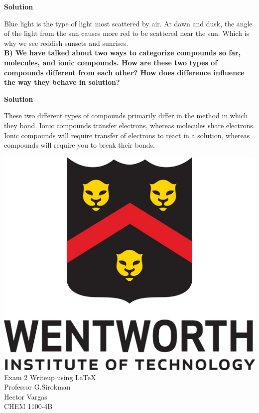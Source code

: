 \documentclass{article}
\begin{document}
    \textbf{Solution}

    Blue light is the type of light most scattered by air. At dawn and dusk, the angle of the light from the sun causes more red to be scattered near the sun. Which is why we see reddish sunsets and sunrises.\\[1cm]

    \textbf{B) We have talked about two ways to categorize compounds so far, molecules, and ionic compounds. How are these two types of compounds different from each other? How does difference influence the way they behave in solution?}

    \textbf{Solution}

    These two different types of compounds primarily differ in the method in which they bond. Ionic compounds transfer electrons, whereas molecules share electrons. Ionic compounds will require transfer of electrons to react in a solution, whereas compounds will require you to break their bonds.

    \pagebreak

    \thispagestyle{empty}
    \begin{center}
        \includegraphics[scale=0.3]{wit_logo}\\[1cm]
        Exam 2 Writeup using  \LaTeX\\
        Professor G.Sirokman\\
        Hector Vargas\\
        CHEM 1100-4B
    \end{center}
    \pagebreak
\end{document}
